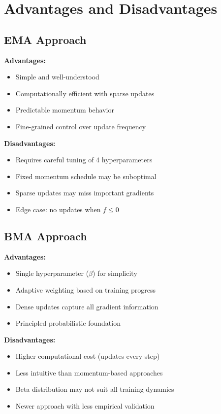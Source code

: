 \documentclass[11pt]{article}
\begin{document}
\section{Advantages and Disadvantages}

\subsection{EMA Approach}

\textbf{Advantages:}
\begin{itemize}
\item Simple and well-understood
\item Computationally efficient with sparse updates
\item Predictable momentum behavior
\item Fine-grained control over update frequency
\end{itemize}

\textbf{Disadvantages:}
\begin{itemize}
\item Requires careful tuning of 4 hyperparameters
\item Fixed momentum schedule may be suboptimal
\item Sparse updates may miss important gradients
\item Edge case: no updates when $f \leq 0$
\end{itemize}

\subsection{BMA Approach}

\textbf{Advantages:}
\begin{itemize}
\item Single hyperparameter ($\beta$) for simplicity
\item Adaptive weighting based on training progress
\item Dense updates capture all gradient information
\item Principled probabilistic foundation
\end{itemize}

\textbf{Disadvantages:}
\begin{itemize}
\item Higher computational cost (updates every step)
\item Less intuitive than momentum-based approaches
\item Beta distribution may not suit all training dynamics
\item Newer approach with less empirical validation
\end{itemize}
\end{document}
